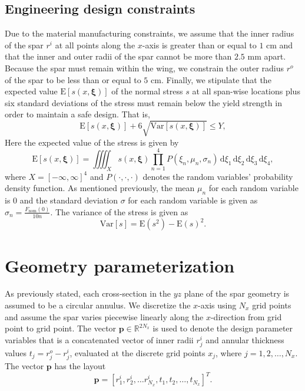 \documentclass[10pt]{article}
\newcommand{\bs}[1] {\boldsymbol{#1}}
\begin{document}
\subsection{Engineering design constraints}

Due to the material manufacturing constraints, we assume
that the inner radius of the spar $r^i$ at all points
along the $x$-axis is greater than or equal to $1$ cm
and that the inner and outer radii of the spar cannot
be more than $2.5$ mm apart. Because the spar must
remain within the wing, we constrain the outer radius
$r^o$ of the spar to be less than or equal to $5$ cm.
Finally, we stipulate that the expected value
$\text{E}[s(x, \bs{\xi})]$  of
the normal stress $s$ at all span-wise locations
plus six standard
deviations of the stress must remain below the yield
strength in order to maintain a safe design. That is,
%
\begin{equation}
\text{E} [ s(x, \bs{\xi}) ] + 6 \sqrt{\text{Var}[s(x, \bs{\xi})]}
\leq Y,
\end{equation}
%
Here the expected value of the stress is given by
%
\begin{equation}
\text{E}[ s(x, \bs{\xi}) ] =
\iiiint _{X} s(x, \bs{\xi}) \prod_{n=1}^{4} P(\xi_n, \mu_n, \sigma_n)
\, \text{d} \xi_1
\, \text{d} \xi_2
\, \text{d} \xi_3
\, \text{d} \xi_4,
\label{eq:expected}
\end{equation}
%
where $X = [-\infty,\infty]^4$ and $P(\cdot,\cdot,\cdot)$ denotes
the random variables' probability density function.
As mentioned previously, the mean $\mu_n$ for each random variable
is $0$ and
the standard deviation $\sigma$ for each random variable
is given as $\sigma_n = \frac{F_{\text{nom}}(0)}{10n}$.
The variance of the stress is given as
%
\begin{equation}
\text{Var}[s] = \text{E}(s^2) - \text{E}(s)^2.
\end{equation}

\section{Geometry parameterization}

As previously stated, each cross-section in the $yz$
plane of the spar geometry is assumed to be a circular
annulus. We discretize the $x$-axis using $N_x$
grid points and assume the spar varies piecewise
linearly along the $x$-direction from grid point
to grid point. The vector $\bs{p} \in \mathbb{R}^{2 N_x}$
is used to denote the design parameter variables that
is a concatenated vector of inner radii $r^i_j$
and annular thickness values $t_j = r^o_j - r^i_j$,
evaluated at the discrete grid points $x_j$,
where $j=1,2,\dots,N_x$. The vector $\bs{p}$ has the
layout
%
\begin{equation}
\bs{p} = [r^i_1, r^i_2, \dots r^i_{N_x}, t_1, t_2, \dots, t_{N_x}]^T.
\end{equation}
\end{document}
